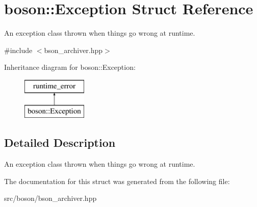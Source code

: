 \hypertarget{structboson_1_1Exception}{}\section{boson\+:\+:Exception Struct Reference}
\label{structboson_1_1Exception}


An exception class thrown when things go wrong at runtime.  




{\ttfamily \#include $<$bson\+\_\+archiver.\+hpp$>$}

Inheritance diagram for boson\+:\+:Exception\+:\begin{figure}[H]
\begin{center}
\leavevmode
\includegraphics[height=2.000000cm]{structboson_1_1Exception}
\end{center}
\end{figure}


\subsection{Detailed Description}
An exception class thrown when things go wrong at runtime. 

The documentation for this struct was generated from the following file\+:\begin{DoxyCompactItemize}
\item 
src/boson/bson\+\_\+archiver.\+hpp\end{DoxyCompactItemize}
